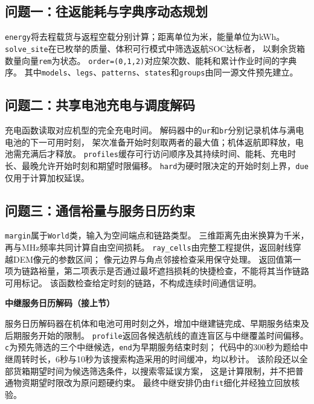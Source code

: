 \documentclass[bwprint]{gmcmthesis}
\begin{document}
\begin{appendices}
\clearpage
\subsection{问题一：往返能耗与字典序动态规划}
\texttt{energy}将去程载货与返程空载分别计算；距离单位为米，能量单位为kWh。
\texttt{solve\_site}在已枚举的质量、体积可行模式中筛选返航SOC达标者，
以剩余货箱数量向量\texttt{rem}为状态。
\texttt{order=(0,1,2)}对应架次数、能耗和累计作业时间的字典序。
其中\texttt{models}、\texttt{legs}、\texttt{patterns}、\texttt{states}和\texttt{groups}由同一源文件预先建立。


\clearpage
\subsection{问题二：共享电池充电与调度解码}
充电函数读取对应机型的完全充电时间。
解码器中的\texttt{ur}和\texttt{br}分别记录机体与满电电池的下一可用时刻，
架次准备开始时刻取两者的最大值；机体返航即释放，电池需充满后才释放。
\texttt{profiles}缓存可行访问顺序及其持续时间、能耗、充电时长、最晚允许开始时刻和期望时限偏移。
\texttt{hard}为硬时限决定的开始时刻上界，\texttt{due}仅用于计算加权延误。



\clearpage
\subsection{问题三：通信裕量与服务日历约束}
\texttt{margin}属于\texttt{World}类，输入为空间端点和链路类型。
三维距离先由米换算为千米，再与MHz频率共同计算自由空间损耗。
\texttt{ray\_cells}由完整工程提供，返回射线穿越DEM像元的参数区间；
像元边界与角点邻接检查采用保守处理。
返回值第一项为链路裕量，第二项表示是否通过最坏遮挡损耗的快捷检查，不能将其当作链路可用标记。
该函数检查给定时刻的链路，不构成连续时间通信证明。


\clearpage
\noindent\textbf{中继服务日历解码（接上节）}

服务日历解码器在机体和电池可用时刻之外，增加中继建链完成、早期服务结束及后期服务开始的限制。
\texttt{profile}返回各候选航线的直连盲区与中继覆盖时间偏移。
\texttt{c}为预先筛选的三个中继候选，\texttt{end}为早期服务结束时刻；
代码中的300秒为题给中继周转时长，6秒与10秒为该搜索构造采用的时间缓冲，均以秒计。
该阶段还以全部货箱期望时间为候选筛选条件，以搜索零延误方案，
这是计算限制，并不把普通物资期望时限改为原问题硬约束。
最终中继安排仍由\texttt{fit}细化并经独立回放核验。



\end{appendices}
\end{document}
